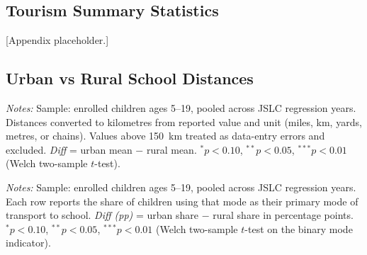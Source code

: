\documentclass[12pt]{article}
\newcommand*{\TableSumPath}{../Paper_3_Tables/Summary_Stats}
\begin{document}
	\FloatBarrier

	\subsection{Tourism Summary Statistics}
	\label{subsec:app_tourism_stats}

	[Appendix placeholder.]

	\subsection{Urban vs Rural School Distances}
	\label{subsec:app_urban_rural}


	\begin{table}[H]
	\centering
	\begin{threeparttable}
		\caption{School Distance by Urban/Rural Status}
		\label{tab:distance_urban_rural}
		{\small}
		\begin{tablenotes}
			\small
			\item \textit{Notes:} Sample: enrolled children ages 5--19, pooled across JSLC regression years. Distances converted to kilometres from reported value and unit (miles, km, yards, metres, or chains). Values above 150~km treated as data-entry errors and excluded. \textit{Diff} = urban mean $-$ rural mean. $^{*}p<0.10$, $^{**}p<0.05$, $^{***}p<0.01$ (Welch two-sample $t$-test).
		\end{tablenotes}
	\end{threeparttable}
	\end{table}

	\begin{table}[H]
	\centering
	\begin{threeparttable}
		\caption{Mode of Transport to School by Urban/Rural Status}
		\label{tab:transport_urban_rural}
		{\small}
		\begin{tablenotes}
			\small
			\item \textit{Notes:} Sample: enrolled children ages 5--19, pooled across JSLC regression years. Each row reports the share of children using that mode as their primary mode of transport to school. \textit{Diff (pp)} = urban share $-$ rural share in percentage points. $^{*}p<0.10$, $^{**}p<0.05$, $^{***}p<0.01$ (Welch two-sample $t$-test on the binary mode indicator).
		\end{tablenotes}
	\end{threeparttable}
	\end{table}
\end{document}
